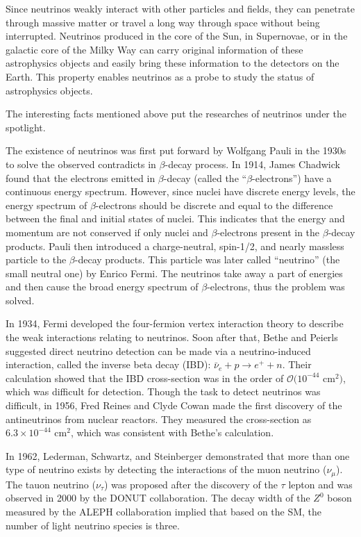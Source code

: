 Since neutrinos weakly interact with other particles and fields, they can penetrate through massive matter or travel a long way through space without being interrupted. Neutrinos produced in the core of the Sun, in Supernovae, or in the galactic core of the Milky Way can carry original information of these astrophysics objects and easily bring these information to the detectors on the Earth. This property enables neutrinos as a probe to study the status of astrophysics objects.

The interesting facts mentioned above put the researches of neutrinos under the spotlight. 

The existence of neutrinos was first put forward by Wolfgang Pauli in the 1930s to solve the observed contradicts in $\beta$-decay process. In 1914, James Chadwick found that the electrons emitted in $\beta$-decay (called the ``$\beta$-electrons'') have a continuous energy spectrum\cite{leite1996weak}. However, since nuclei have discrete energy levels, the energy spectrum of $\beta$-electrons should be discrete and equal to the difference between the final and initial states of nuclei. This indicates that the energy and momentum are not conserved if only nuclei and $\beta$-electrons present in the $\beta$-decay products. Pauli then introduced a charge-neutral, spin-1/2, and nearly massless particle to the $\beta$-decay products. This particle was later called ``neutrino'' (the small neutral one) by Enrico Fermi. The neutrinos take away a part of energies and then cause the broad energy spectrum of $\beta$-electrons, thus the problem was solved.

In 1934, Fermi developed the four-fermion vertex interaction theory to describe the weak interactions relating to neutrinos. Soon after that, Bethe and Peierls suggested direct neutrino detection can be made via a neutrino-induced interaction, called the inverse beta decay (IBD): $\bar{\nu}_e+p\to e^+ + n$. Their calculation showed that the IBD cross-section was in the order of $\mathcal{O}(10^{-44}$ cm$^2)$, which was difficult for detection\cite{bethe1934neutrino}. Though the task to detect neutrinos was difficult, in 1956, Fred Reines and Clyde Cowan made the first discovery of the antineutrinos from nuclear reactors. They measured the cross-section as $6.3\times10^{-44}$ cm$^2$, which was consistent with Bethe's calculation\cite{reines1960detection}.

In 1962, Lederman, Schwartz, and Steinberger demonstrated that more than one type of neutrino exists by detecting the interactions of the muon neutrino ($\nu_\mu$)\cite{danby1962observation}. The tauon neutrino ($\nu_\tau$) was proposed after the discovery of the $\tau$ lepton and was observed in 2000 by the DONUT collaboration\cite{kodama2001observation}. The decay width of the $Z^0$ boson measured by the ALEPH collaboration implied that based on the SM, the number of light neutrino species is three\cite{decamp1989determination}.

